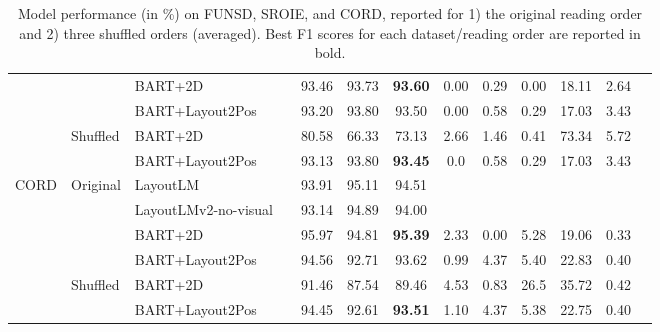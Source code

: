 \begin{table}[h]
\begin{adjustbox}{max width=\textwidth}
\begin{threeparttable}
\begin{tabular}{lllcccccccccc}
      & & BART+2D & & 93.46 &	93.73 &	\textbf{93.60} & 0.00 &	0.29 &	0.00 &	18.11 &	2.64  \\
      & & BART+Layout2Pos & & 93.20 &	93.80 &	93.50 & 0.00 &	0.58 &	0.29 &	17.03 &	3.43 \\
      \cline{2-12}
      & \multirow{2}{*}{Shuffled} & BART+2D & & 80.58 & 66.33 & 73.13	 &  2.66 & 1.46 & 0.41 & 73.34 & 5.72 \\ 
      & & BART+Layout2Pos & & 93.13 &	93.80 &	\textbf{93.45} & 0.0 & 0.58 & 0.29 & 17.03 & 3.43 \\ 
      \midrule
      \multirow{6}{*}{CORD} & \multirow{4}{*}{Original} & LayoutLM  \citep{xu2020layoutlm} & & 93.91 & 95.11 & 94.51 & \cellcolor[gray]{0.9} & \cellcolor[gray]{0.9} & \cellcolor[gray]{0.9} & \cellcolor[gray]{0.9} & \cellcolor[gray]{0.9}  \\ 
      & & LayoutLMv2-no-visual             & & 93.14 &	94.89 &	94.00 & \cellcolor[gray]{0.9} & \cellcolor[gray]{0.9} & \cellcolor[gray]{0.9} & \cellcolor[gray]{0.9} &  \cellcolor[gray]{0.9} \\  
      & & BART+2D & & 95.97 &	94.81 &	\textbf{95.39} & 2.33 & 0.00 & 5.28 & 19.06 &	0.33 \\
      & & BART+Layout2Pos & & 94.56 &	92.71 &	93.62 & 0.99 & 4.37 & 5.40 & 22.83 & 0.40 \\
      \cline{2-12}
      & \multirow{2}{*}{Shuffled} & BART+2D & & 91.46 & 87.54 & 89.46	 & 4.53 & 0.83 & 26.5 & 35.72 & 0.42	 \\ 
      & & BART+Layout2Pos & & 94.45 & 92.61 &	\textbf{93.51} &  1.10 & 4.37 & 5.38 & 22.75 & 0.40  \\ 
      \bottomrule
  \end{tabular}
  \end{threeparttable}
  \end{adjustbox}
  \caption{Model performance (in \%) on FUNSD, SROIE, and CORD, reported for 1) the original reading order and 2) three shuffled orders (averaged). Best F1 scores for each dataset/reading order are reported in bold.}
  \label{table:visual-information-extraction-results}
\end{table}



